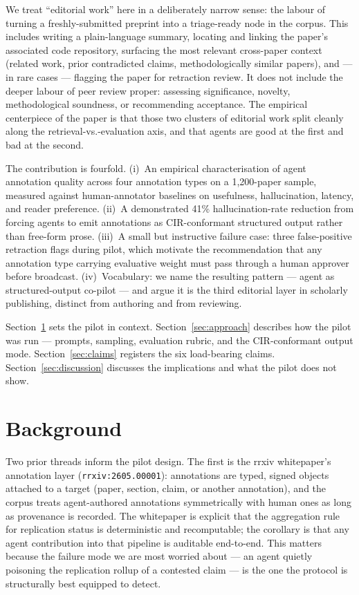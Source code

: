 \documentclass{rrxiv}
\begin{document}
We treat ``editorial work'' here in a deliberately narrow sense: the labour of turning a freshly-submitted preprint into a triage-ready node in the corpus. This includes writing a plain-language summary, locating and linking the paper's associated code repository, surfacing the most relevant cross-paper context (related work, prior contradicted claims, methodologically similar papers), and --- in rare cases --- flagging the paper for retraction review. It does not include the deeper labour of peer review proper: assessing significance, novelty, methodological soundness, or recommending acceptance. The empirical centerpiece of the paper is that those two clusters of editorial work split cleanly along the retrieval-vs.-evaluation axis, and that agents are good at the first and bad at the second.

The contribution is fourfold. (i)~An empirical characterisation of agent annotation quality across four annotation types on a 1{,}200-paper sample, measured against human-annotator baselines on usefulness, hallucination, latency, and reader preference. (ii)~A demonstrated 41\% hallucination-rate reduction from forcing agents to emit annotations as CIR-conformant structured output rather than free-form prose. (iii)~A small but instructive failure case: three false-positive retraction flags during pilot, which motivate the recommendation that any annotation type carrying evaluative weight must pass through a human approver before broadcast. (iv)~Vocabulary: we name the resulting pattern --- agent as structured-output co-pilot --- and argue it is the third editorial layer in scholarly publishing, distinct from authoring and from reviewing.

Section~\ref{sec:background} sets the pilot in context. Section~\ref{sec:approach} describes how the pilot was run --- prompts, sampling, evaluation rubric, and the CIR-conformant output mode. Section~\ref{sec:claims} registers the six load-bearing claims. Section~\ref{sec:discussion} discusses the implications and what the pilot does not show.

\section{Background}
\label{sec:background}

Two prior threads inform the pilot design. The first is the rrxiv whitepaper's annotation layer (\texttt{rrxiv:2605.00001}): annotations are typed, signed objects attached to a target (paper, section, claim, or another annotation), and the corpus treats agent-authored annotations symmetrically with human ones as long as provenance is recorded. The whitepaper is explicit that the aggregation rule for replication status is deterministic and recomputable; the corollary is that any agent contribution into that pipeline is auditable end-to-end. This matters because the failure mode we are most worried about --- an agent quietly poisoning the replication rollup of a contested claim --- is the one the protocol is structurally best equipped to detect.
\end{document}
